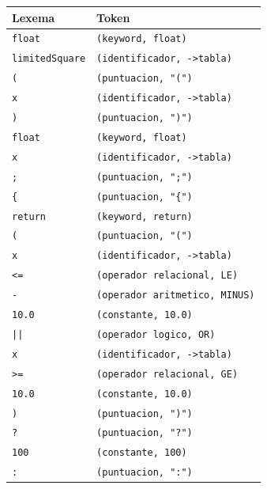 \documentclass[12pt, letterpaper]{article}
\begin{document}
\begin{enumerate}
    \begin{center}
      \begin{tabular}{ll}
        \toprule
        \textbf{Lexema} & \textbf{Token} \\
        \midrule
        \texttt{float}          & \texttt{(keyword, float)} \\
        \texttt{limitedSquare}  & \texttt{(identificador, ->tabla)} \\
        \texttt{(}              & \texttt{(puntuacion, "(")} \\
        \texttt{x}              & \texttt{(identificador, ->tabla)} \\
        \texttt{)}              & \texttt{(puntuacion, ")")} \\
        \texttt{float}          & \texttt{(keyword, float)} \\
        \texttt{x}              & \texttt{(identificador, ->tabla)} \\
        \texttt{;}              & \texttt{(puntuacion, ";")} \\
        \texttt{\{}             & \texttt{(puntuacion, "\{")} \\
        \texttt{return}         & \texttt{(keyword, return)} \\
        \texttt{(}              & \texttt{(puntuacion, "(")} \\
        \texttt{x}              & \texttt{(identificador, ->tabla)} \\
        \texttt{<=}             & \texttt{(operador relacional, LE)} \\
        \texttt{-}              & \texttt{(operador aritmetico, MINUS)} \\
        \texttt{10.0}           & \texttt{(constante, 10.0)} \\
        \texttt{||}             & \texttt{(operador logico, OR)} \\
        \texttt{x}              & \texttt{(identificador, ->tabla)} \\
        \texttt{>=}             & \texttt{(operador relacional, GE)} \\
        \texttt{10.0}           & \texttt{(constante, 10.0)} \\
        \texttt{)}              & \texttt{(puntuacion, ")")} \\
        \texttt{?}              & \texttt{(puntuacion, "?")} \\
        \texttt{100}            & \texttt{(constante, 100)} \\
        \texttt{:}              & \texttt{(puntuacion, ":")} \\

\end{tabular}
\end{center}
\end{enumerate}
\end{document}
